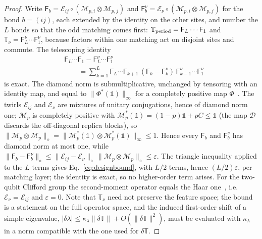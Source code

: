 \documentclass[aps,prx,reprint,superscriptaddress,nobibnotes,longbibliography]{revtex4-2}
\theoremstyle{remark}
\newcommand{\Tper}{\mathbb T_{\rm period}}
\begin{document}
\begin{proof}
Write $\mathsf F_b=\mathcal E_{ij}\circ(\mathcal M_{p,i}\otimes\mathcal M_{p,j})$ and $\mathsf F_b^\nu=\mathcal E_\nu\circ(\mathcal M_{p,i}\otimes\mathcal M_{p,j})$ for the bond $b=(ij)$, each extended by the identity on the other sites, and number the $L$ bonds so that the odd matching comes first: $\Tper=\mathsf F_L\cdots\mathsf F_1$ and $\mathbb T_\nu=\mathsf F^\nu_L\cdots\mathsf F^\nu_1$, because factors within one matching act on disjoint sites and commute.  The telescoping identity
\begin{align*}
 &\mathsf F_L\cdots\mathsf F_1-\mathsf F^\nu_L\cdots\mathsf F^\nu_1\\
 &\qquad=\sum_{k=1}^{L}\mathsf F_L\cdots\mathsf F_{k+1}\,(\mathsf F_k-\mathsf F^\nu_k)\,\mathsf F^\nu_{k-1}\cdots\mathsf F^\nu_1
\end{align*}
is exact.  The diamond norm is submultiplicative, unchanged by tensoring with an identity map, and equal to $\|\Phi^*(\mathbb 1)\|_\infty$ for a completely positive map $\Phi$~\cite{Watrous2018}.  The twirls $\mathcal E_{ij}$ and $\mathcal E_\nu$ are mixtures of unitary conjugations, hence of diamond norm one; $\mathcal M_p$ is completely positive with $\mathcal M_p^*(\mathbb 1)=(1-p)\mathbb 1+pC\le\mathbb 1$ (the map $\mathcal D$ discards the off-diagonal replica blocks), so $\|\mathcal M_p\otimes\mathcal M_p\|_\diamond=\|\mathcal M_p^*(\mathbb 1)\otimes\mathcal M_p^*(\mathbb 1)\|_\infty\le1$.  Hence every $\mathsf F_b$ and $\mathsf F_b^\nu$ has diamond norm at most one, while $\|\mathsf F_b-\mathsf F_b^\nu\|_\diamond\le\|\mathcal E_{ij}-\mathcal E_\nu\|_\diamond\,\|\mathcal M_p\otimes\mathcal M_p\|_\diamond\le\varepsilon$.  The triangle inequality applied to the $L$ terms gives Eq.~\eqref{eq:designbound}, with $L/2$ terms, hence $(L/2)\varepsilon$, per matching layer; the identity is exact, so no higher-order term arises.  For the two-qubit Clifford group the second-moment operator equals the Haar one~\cite{DiVincenzo2002}, i.e.\ $\mathcal E_\nu=\mathcal E_{ij}$ and $\varepsilon=0$.  Note that $\mathbb T_\nu$ need not preserve the feature space; the bound is a statement on the full operator space, and the induced first-order shift of a simple eigenvalue, $|\delta\lambda|\le\kappa_\lambda\|\delta\mathbb T\|+O(\|\delta\mathbb T\|^2)$, must be evaluated with $\kappa_\lambda$ in a norm compatible with the one used for $\delta\mathbb T$.
\end{proof}
\end{document}
